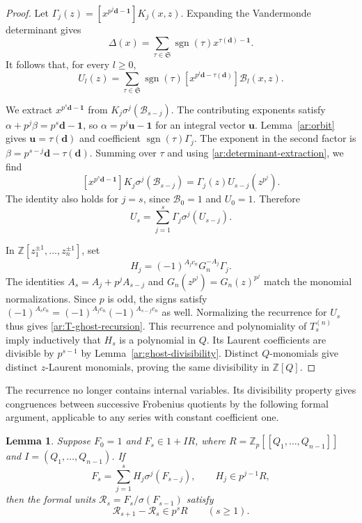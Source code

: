 \documentclass[11pt]{amsart}
\newtheorem{lemma}[theorem]{Lemma}
\theoremstyle{definition}
\theoremstyle{remark}
\numberwithin{equation}{section}
\newcommand{\Z}{\mathbb Z}
\begin{document}
\begin{proof}
Let $\Gamma_j(z)=[x^{p^j\mathbf d-\mathbf1}]K_j(x,z)$.
Expanding the Vandermonde determinant gives
\begin{equation}\label{ar:determinant-expansion}
 \Delta(x)=\sum_{\tau\in\mathfrak S}
       \operatorname{sgn}(\tau)x^{\tau(\mathbf d)-\mathbf1}.
\end{equation}
It follows that, for every $l\geq0$,
\begin{equation}\label{ar:determinant-extraction}
 U_l(z)=\sum_{\tau\in\mathfrak S}\operatorname{sgn}(\tau)
 [x^{p^l\mathbf d-\tau(\mathbf d)}]\mathcal B_l(x,z).
\end{equation}

We extract $x^{p^s\mathbf d-\mathbf1}$ from
$K_j\sigma^j(\mathcal B_{s-j})$. The contributing exponents
satisfy $\alpha+p^j\beta=p^s\mathbf d-\mathbf1$, so
$\alpha=p^j\boldsymbol u-\mathbf1$ for an integral vector
$\boldsymbol u$. Lemma~\ref{ar:orbit} gives
$\boldsymbol u=\tau(\mathbf d)$ and coefficient
$\operatorname{sgn}(\tau)\Gamma_j$. The exponent in the second
factor is $\beta=p^{s-j}\mathbf d-\tau(\mathbf d)$.
Summing over $\tau$ and using \eqref{ar:determinant-extraction},
we find
\[
 [x^{p^s\mathbf d-\mathbf1}]
 K_j\sigma^j(\mathcal B_{s-j})
 =\Gamma_j(z)U_{s-j}(z^{p^j}).
\]
The identity also holds for $j=s$, since $\mathcal B_0=1$ and
$U_0=1$. Therefore
\[
 U_s=\sum_{j=1}^s\Gamma_j\sigma^j(U_{s-j}).
\]

In $\Z[z_1^{\pm1},\ldots,z_n^{\pm1}]$, set
\[
 H_j=(-1)^{A_jc_n}G_n^{-A_j}\Gamma_j.
\]
The identities $A_s=A_j+p^jA_{s-j}$ and
$G_n(z^{p^j})=G_n(z)^{p^j}$ match the monomial normalizations.
Since $p$ is odd, the signs satisfy
$(-1)^{A_sc_n}=(-1)^{A_jc_n}(-1)^{A_{s-j}c_n}$ as well.
Normalizing the recurrence for $U_s$ thus gives
\eqref{ar:T-ghost-recursion}. This recurrence and polynomiality
of $T_s^{(n)}$ imply inductively that $H_s$ is a polynomial in
$Q$. Its Laurent coefficients are divisible by $p^{s-1}$ by
Lemma~\ref{ar:ghost-divisibility}. Distinct $Q$-monomials give
distinct $z$-Laurent monomials, proving the same divisibility in
$\Z[Q]$.
\end{proof}

The recurrence no longer contains internal variables. Its
divisibility property gives congruences between successive
Frobenius quotients by the following formal argument, applicable
to any series with constant coefficient one.

\begin{lemma}\label{ar:formal-ghost}
Suppose $F_0=1$ and $F_s\in1+I R$, where
$R=\Z_p[[Q_1,\ldots,Q_{n-1}]]$ and $I=(Q_1,\ldots,Q_{n-1})$.
If
\[
 F_s=\sum_{j=1}^s H_j\sigma^j(F_{s-j}),\qquad H_j\in p^{j-1}R,
\]
then the formal units $\mathcal R_s=F_s/\sigma(F_{s-1})$ satisfy
\begin{equation}\label{ar:ratio-congruence}
 \mathcal R_{s+1}-\mathcal R_s\in p^sR\qquad(s\geq1).
\end{equation}
\end{lemma}
\end{document}
